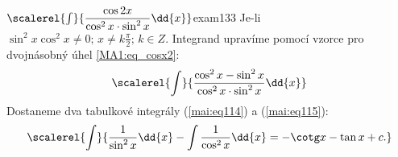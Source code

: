 % 
\begin{mathexam}{\(\scalerel{\int}{\dfrac{\cos2x}{\cos^2x\cdot\sin^2x}\dd{x}}\)}{exam133} 
  Je-li \(\sin^2x\cos^2x\neq0;\, x\neq k\frac{\pi}{2};\, k\in Z\). Integrand upravíme pomocí vzorce
  pro dvojnásobný úhel \ref{MA1:eq_cosx2}:
  \begin{equation*}
    \scalerel{\int}{\frac{\cos^2x-\sin^2x}{\cos^2x\cdot\sin^2x}\dd{x}}
  \end{equation*}
  Dostaneme dva tabulkové integrály (\ref{mai:eq114}) a (\ref{mai:eq115}):
  \begin{gather*}
    \scalerel{\int}{\frac{1}{\sin^2x}\dd{x} -\int\frac{1}{\cos^2x}\dd{x} = -\cotg x - \tan x + c.}
  \end{gather*}
\end{mathexam}